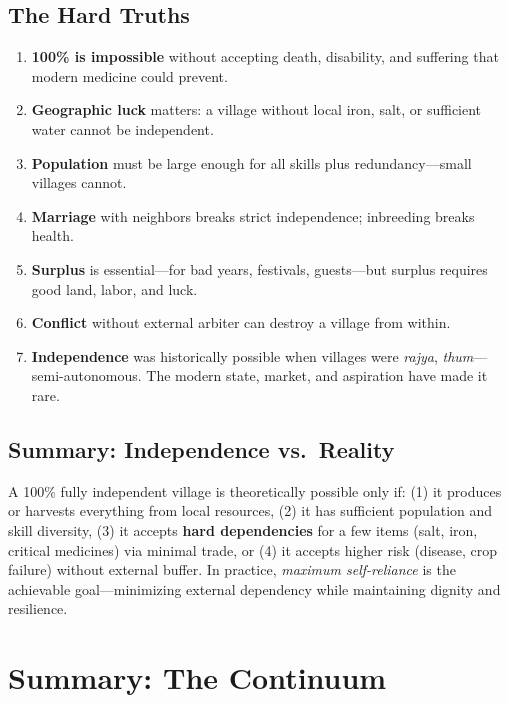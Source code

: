 \documentclass[11pt,a4paper]{article}
\begin{document}
\subsection{The Hard Truths}
\begin{enumerate}
    \item \textbf{100\% is impossible} without accepting death, disability, and suffering that modern medicine could prevent.
    \item \textbf{Geographic luck} matters: a village without local iron, salt, or sufficient water cannot be independent.
    \item \textbf{Population} must be large enough for all skills plus redundancy---small villages cannot.
    \item \textbf{Marriage} with neighbors breaks strict independence; inbreeding breaks health.
    \item \textbf{Surplus} is essential---for bad years, festivals, guests---but surplus requires good land, labor, and luck.
    \item \textbf{Conflict} without external arbiter can destroy a village from within.
    \item \textbf{Independence} was historically possible when villages were \textit{rajya}, \textit{thum}---semi-autonomous. The modern state, market, and aspiration have made it rare.
\end{enumerate}

\subsection{Summary: Independence vs.\ Reality}
A 100\% fully independent village is theoretically possible only if: (1) it produces or harvests everything from local resources, (2) it has sufficient population and skill diversity, (3) it accepts \textbf{hard dependencies} for a few items (salt, iron, critical medicines) via minimal trade, or (4) it accepts higher risk (disease, crop failure) without external buffer. In practice, \textit{maximum self-reliance} is the achievable goal---minimizing external dependency while maintaining dignity and resilience.

\section{Summary: The Continuum}
\end{document}
